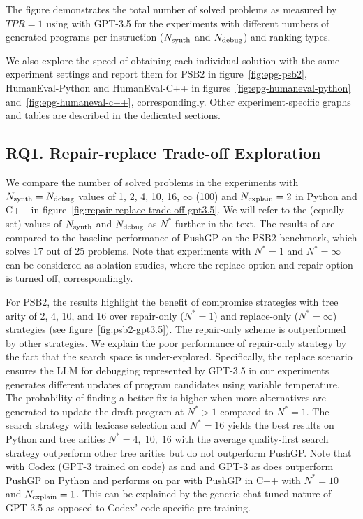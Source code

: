 The figure demonstrates the total number of solved problems as measured by $TPR=1$ using \method{} with GPT-3.5 for the experiments with different numbers of generated programs per instruction ($N_\text{synth}$ and $N_\text{debug}{}$) and ranking types.

We also explore the speed of obtaining each individual solution with the same experiment settings and report them for PSB2 in figure~\ref{fig:epg-psb2}, HumanEval-Python and HumanEval-C++ in figures~\ref{fig:epg-humaneval-python} and~\ref{fig:epg-humaneval-c++}, correspondingly.
Other experiment-specific graphs and tables are described in the dedicated sections. 


\newpage \subsection{RQ1. Repair-replace Trade-off Exploration}
\label{sec:rq1}

We compare the number of solved problems in the experiments with $N_\text{synth}{}=N_\text{debug}{}$ values of 1, 2, 4, 10, 16, $\infty$ (100) and $N_\text{explain}{}=2$ in Python and C++ in figure~\ref{fig:repair-replace-trade-off-gpt3.5}. 
We will refer to the (equally set) values of $N_\text{synth}{}$ and $N_\text{debug}{}$ as $N^*$ further in the text.
The results of \method{} are compared to the baseline performance of PushGP on the PSB2 benchmark, which solves 17 out of 25 problems. 
Note that experiments with $N^*=1$ and $N^*=\infty$ can be considered as ablation studies, where the replace option and repair option is turned off, correspondingly. 

For PSB2, the results highlight the benefit of compromise strategies with tree arity of 2, 4, 10, and 16 over repair-only ($N^*=1$) and replace-only ($N^*=\infty$) strategies (see figure~\ref{fig:psb2-gpt3.5}). 
The repair-only scheme is outperformed by other strategies. 
We explain the poor performance of repair-only strategy by the fact that the search space is under-explored. 
Specifically, the replace scenario ensures the LLM for debugging represented by GPT-3.5 in our experiments generates different updates of program candidates using variable temperature.
The probability of finding a better fix is higher when more alternatives are generated to update the draft program at $N^*>1$ compared to $N^*=1$. 
The search strategy with lexicase selection and $N^*=16$ yields the best results on Python and tree arities  $N^*=4, \; 10, \; 16$ with the average quality-first search strategy outperform other tree arities but do not outperform PushGP.
Note that \method{} with Codex (GPT-3 trained on code) as \synthmodel{} and \debugmodel{} and GPT-3 as \textmodel{} does outperform PushGP on Python and performs on par with PushGP in C++ with $N^*=10$ and $N_\text{explain}{}=1$. %
This can be explained by the generic chat-tuned nature of GPT-3.5 as opposed to Codex' code-specific pre-training. 

